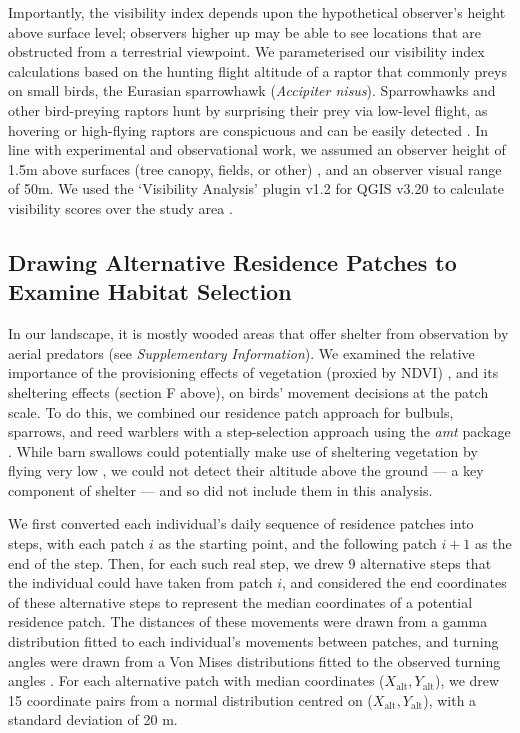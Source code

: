 Importantly, the visibility index depends upon the hypothetical observer's height above surface level; observers higher up may be able to see locations that are obstructed from a terrestrial viewpoint.
We parameterised our visibility index calculations based on the hunting flight altitude of a raptor that commonly preys on small birds, the Eurasian sparrowhawk (\textit{Accipiter nisus}).
Sparrowhawks and other bird-preying raptors hunt by surprising their prey via low-level flight, as hovering or high-flying raptors are conspicuous and can be easily detected \parencite{krams2001,krams2020}.
In line with experimental and observational work, we assumed an observer height of 1.5m above surfaces (tree canopy, fields, or other) \citep{seress2011,krams2020}, and an observer visual range of 50m.
We used the `Visibility Analysis' plugin v1.2 for QGIS v3.20 to calculate visibility scores over the study area \citep{cuckovic2016}.

\subsection*{Drawing Alternative Residence Patches to Examine Habitat Selection}

In our landscape, it is mostly wooded areas that offer shelter from observation by aerial predators (see \textit{Supplementary Information}).
We examined the relative importance of the provisioning effects of vegetation (proxied by NDVI) \parencite{pettorelli2011}, and its sheltering effects (section F above), on birds' movement decisions at the patch scale.
To do this, we combined our residence patch approach for bulbuls, sparrows, and reed warblers with a step-selection approach \citep{thurfjell2014,avgar2016} using the \textit{amt} package \citep{signer2019}.
While barn swallows could potentially make use of sheltering vegetation by flying very low \parencite{warrick2016}, we could not detect their altitude above the ground --- a key component of shelter --- and so did not include them in this analysis.

We first converted each individual's daily sequence of residence patches into steps, with each patch $i$ as the starting point, and the following patch $i+1$ as the end of the step.
Then, for each such real step, we drew 9 alternative steps that the individual could have taken from patch $i$, and considered the end coordinates of these alternative steps to represent the median coordinates of a potential residence patch.
The distances of these movements were drawn from a gamma distribution fitted to each individual's movements between patches, and turning angles were drawn from a Von Mises distributions fitted to the observed turning angles \citep{signer2019}.
For each alternative patch with median coordinates ($X_\text{alt}, Y_\text{alt}$), we drew 15 coordinate pairs from a normal distribution centred on ($X_\text{alt}, Y_\text{alt}$), with a standard deviation of 20 m.

